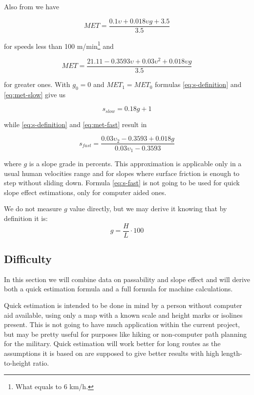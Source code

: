 \documentclass[12pt]{article}
\begin{document}
Also from \cite{acsm-guidelines} we have

\begin{equation} \label{eq:met-slow}
MET=\frac{0.1\upsilon+0.018\upsilon g + 3.5}{3.5}
\end{equation}

for speeds less than 100 m/min\footnote{What equals to 6 km/h.} and

\begin{equation} \label{eq:met-fast}
MET=\frac{21.11 - 0.3593\upsilon + 0.03\upsilon^{2} + 0.018\upsilon g}{3.5}
\end{equation}

for greater ones. With $g_{0} = 0$ and $MET_{1} = MET_{0}$ formulas \ref{eq:s-definition} and \ref{eq:met-slow} give us

\begin{equation} \label{eq:s-slow}
s_{slow} = 0.18g + 1
\end{equation}

while \ref{eq:s-definition} and \ref{eq:met-fast} result in

\begin{equation} \label{eq:s-fast}
s_{fast} = \frac{0.03\upsilon_{2}-0.3593 + 0.018g}{0.03\upsilon_{1}-0.3593}
\end{equation}

where $g$ is a slope grade in percents. This approximation is applicable only in a usual human velocities range and for slopes where surface friction is enough to step without sliding down. Formula \ref{eq:s-fast} is not going to be used for quick slope effect estimations, only for computer aided ones. 

We do not measure $g$ value directly, but we may derive it knowing that by definition \cite{wiki-grade} it is:
\begin{equation} \label{eq:g-def}
g = \frac{H}{L} \cdot 100
\end{equation}


\subsection{Difficulty}
In this section we will combine data on passability and slope effect and will derive both a quick estimation formula and a full formula for machine calculations.

Quick estimation is intended to be done in mind by a person without computer aid available, using only a map with a known scale and height marks or isolines present. This is not going to have much application within the current project, but may be pretty useful for purposes like hiking or non-computer  path planning for the military. Quick estimation will work better for long routes as the assumptions it is based on are supposed to give better results with high length-to-height ratio.
\end{document}
